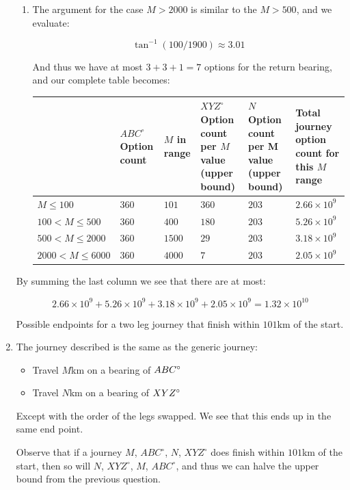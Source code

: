 \documentclass{article}
\begin{document}
\begin{enumerate}
\begin{enumerate}
\item The argument for the case $M>2000$ is similar to the $M>500$, and we evaluate:

$$\tan^{-1}(100/1900) \approx 3.01$$

And thus we have at most $3+3+1=7$ options for the return bearing, and our complete table becomes:


        \begin{table}[h]
\centering
\begin{tabularx}{\textwidth}{|l|X|X|X|X|X|}
\hline
 & $ABC^{\circ}$ Option count &  $M$ in range &  $XYZ^{\circ}$ Option count per $M$ value (upper bound) & $N$ Option count per M value (upper bound) & Total journey option count for this $M$ range \\
\hline
$M \le 100$            &  $360$ & $101$ & $360$ & $203$ & $2.66 \times 10^9$\\
\hline
$100 < M \le 500$      & $360$ & $400$ & $180$ & $203$ & $5.26\times10^9$ \\
\hline
$500 < M \le 2000$     & $360$ & $1500$ & $29$ & $203$ & $3.18\times 10^9$ \\
\hline
$2000 < M \le 6000$    & $360$ & $4000$ & $7$ & $203$ & $2.05\times 10^9$ \\
\hline
\end{tabularx}
\end{table}
    \end{enumerate}


By summing the last column we see that there are at most:

$$
2.66\times 10^9 + 5.26\times 10^9 + 3.18\times 10^9 + 2.05 \times 10^9 = 1.32\times 10^{10}
$$

Possible endpoints for a two leg journey that finish within $101$km of the start.

\item 

The journey described is the same as the generic journey: 

\begin{itemize}
    \item Travel $M$km on a bearing of $ABC\degree$
    \item Travel $N$km on a bearing of $XYZ\degree$
\end{itemize}

Except with the order of the legs swapped. We see that this ends up in the same end point.

Observe that if a journey $M$, $ABC^\circ$, $N$, $XYZ^\circ$ does finish within $101$km of the start, then so will $N$, $XYZ^\circ$, $M$, $ABC^\circ$, and thus we can halve the upper bound from the previous question.


\end{enumerate}
\end{document}
